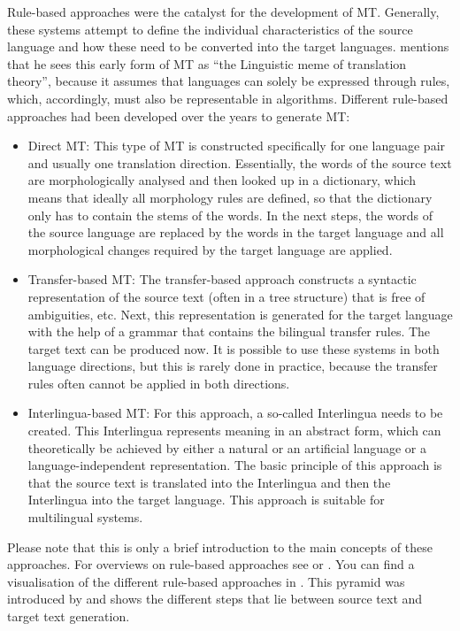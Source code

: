 Rule-based approaches were the catalyst for the development of MT. Generally, these systems attempt to define the individual characteristics of the source language and how these need to be converted into the target languages. \citet[31]{chesterman1997memes} mentions that he sees this early form of MT as “the Linguistic meme of translation theory”, because it assumes that languages can solely be expressed through rules, which, accordingly, must also be representable in algorithms. Different rule-based approaches had been developed over the years to generate MT:

 \begin{itemize}
    \item Direct MT: This type of MT is constructed specifically for one language pair and usually one translation direction. Essentially, the words of the source text are morphologically analysed and then looked up in a dictionary, which means that ideally all morphology rules are defined, so that the dictionary only has to contain the stems of the words. In the next steps, the words of the source language are replaced by the words in the target language and all morphological changes required by the target language are applied.
    \item Transfer-based MT: The transfer-based approach constructs a syntactic representation of the source text (often in a tree structure) that is free of ambiguities, etc. Next, this representation is generated for the target language with the help of a grammar that contains the bilingual transfer rules. The target text can be produced now. It is possible to use these systems in both language directions, but this is rarely done in practice, because the transfer rules often cannot be applied in both directions.
    \item Interlingua-based MT: For this approach, a so-called Interlingua needs to be created. This Interlingua represents meaning in an abstract form, which can theoretically be achieved by either a natural or an artificial language or a language-independent representation. The basic principle of this approach is that the source text is translated into the Interlingua and then the Interlingua into the target language. This approach is suitable for multilingual systems.
\end{itemize}

Please note that this is only a brief introduction to the main concepts of these approaches. For overviews on rule-based approaches see \citet{hutchins1992introduction} or \citet{wilks2008machine}. You can find a visualisation of the different rule-based approaches in . This pyramid was introduced by \citet{vauquois1968survey} and shows the different steps that lie between source text and target text generation.

